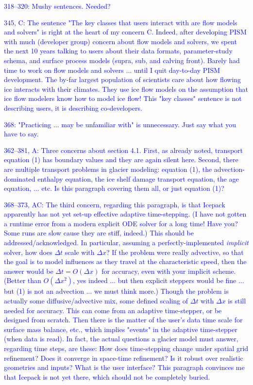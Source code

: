 \documentclass{article}
\theoremstyle{definition}
\theoremstyle{plain}
\begin{document}
\textcolor{blue}{318--320:  Mushy sentences.  Needed?}

\textcolor{blue}{345, C:  The sentence "The key classes that users interact with are flow models and solvers" is right at the heart of my concern C.  Indeed, after developing PISM with much (developer group) concern about flow models and solvers, we spent the next 10 years talking to users about their data formats, parameter-study schema, and surface process models (supra, sub, and calving front).  Barely had time to work on flow models and solvers ... until I quit day-to-day PISM development.  The by-far largest population of scientists care about how flowing ice interacts with their climates.  They use ice flow models on the assumption that ice flow modelers know how to model ice flow!  This "key classes" sentence is not describing users, it is describing co-developers.}

\textcolor{blue}{368:  "Practicing ... may be unfamiliar with" is unnecessary.  Just say what you have to say.}

\textcolor{blue}{362--381, A:  Three concerns about section 4.1.  First, as already noted, transport equation (1) has boundary values and they are again silent here.  Second, there are multiple transport problems in glacier modeling: equation (1), the advection-dominated enthalpy equation, the ice shelf damage transport equation, the age equation, ... etc.  Is this paragraph covering them all, or just equation (1)?}

\textcolor{blue}{368--373, AC:  The third concern, regarding this paragraph, is that Icepack apparently has not yet set-up effective adaptive time-stepping.  (I have not gotten a runtime error from a modern explicit ODE solver for a long time!  Have you?  Some runs are slow cause they are stiff, indeed.)  This should be addressed/acknowledged.  In particular, assuming a perfectly-implemented \emph{implicit} solver, how does $\Delta t$ scale with $\Delta x$?  If the problem were really advective, so that the goal is to model influences as they travel at the characteristic speed, then the answer would be $\Delta t = O(\Delta x)$ for accuracy, even with your implicit scheme.  (Better than $O(\Delta x^2)$, yes indeed ... but then explicit steppers would be fine ... but (1) is not an advection ... we must think more.)  Though the problem is actually some diffusive/advective mix, some defined scaling of $\Delta t$ with $\Delta x$ is still needed for accuracy.  This can come from an adaptive time-stepper, or be designed from scratch.  Then there is the matter of the user's data time scale for surface mass balance, etc., which implies "events" in the adaptive time-stepper (when data is read).  In fact, the actual questions a glacier model must answer, regarding time steps, are these:  How does time-stepping change under spatial grid refinement?  Does it converge in space-time refinement?  Is it robust over realistic geometries and inputs?  What is the user interface?  This paragraph convinces me that Icepack is not yet there, which should not be completely buried.}
\end{document}
